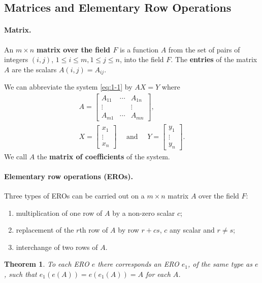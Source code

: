 \documentclass{article}
\newtheorem{theorem}{Theorem}
\begin{document}
\subsection{Matrices and Elementary Row Operations}

\paragraph{Matrix.} An $m \times n$ \textbf{matrix over the field $F$} is a
function $A$ from the set of pairs of integers $(i, j)$, $1 \leq i \leq m, 1
\leq j \leq n$, into the field $F$. The \textbf{entries} of the matrix $A$ are
the scalars $A(i, j) = A_{ij}$.

We can abbreviate the system \eqref{eq:1-1} by $AX = Y$ where
\begin{gather*}
  A = \begin{bmatrix}
    A_{11} & \cdots & A_{1n} \\
    \vdots & & \vdots \\
    A_{m1} & \cdots & A_{mn}
  \end{bmatrix}, \\
  X = \begin{bmatrix}
    x_1 \\
    \vdots \\
    x_n
  \end{bmatrix}
  \quad\text{ and }\quad
  Y = \begin{bmatrix}
    y_1 \\
    \vdots \\
    y_n
  \end{bmatrix}.
\end{gather*}
We call $A$ the \textbf{matrix of coefficients} of the system.

\paragraph{Elementary row operations (EROs).} Three types of EROs can be carried
out on a $m \times n$ matrix $A$ over the field $F$:
\begin{enumerate}
  \item multiplication of one row of $A$ by a non-zero scalar $c$;
  \item replacement of the $r$th row of $A$ by row $r + cs$, $c$ any scalar and
    $r \neq s$;
  \item interchange of two rows of $A$.
\end{enumerate}

\begin{theorem}
  To each ERO $e$ there corresponds an ERO $e_1$, of the same type as $e$, such
  that $e_1(e(A)) = e(e_1(A)) = A$ for each $A$.
\end{theorem}
\end{document}
